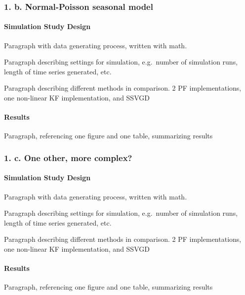 \documentclass[]{article}
\let\oldparagraph\paragraph
\renewcommand{\paragraph}[1]{\oldparagraph{#1}\mbox{}}
\begin{document}
\subsubsection{1. b. Normal-Poisson seasonal
model}\label{b.-normal-poisson-seasonal-model}

\paragraph{Simulation Study Design}\label{simulation-study-design-1}

Paragraph with data generating process, written with math.

Paragraph describing settings for simulation, e.g.~number of simulation
runs, length of time series generated, etc.

Paragraph describing different methods in comparison. 2 PF
implementations, one non-linear KF implementation, and SSVGD

\paragraph{Results}\label{results-1}

Paragraph, referencing one figure and one table, summarizing results

\subsubsection{1. c. One other, more
complex?}\label{c.-one-other-more-complex}

\paragraph{Simulation Study Design}\label{simulation-study-design-2}

Paragraph with data generating process, written with math.

Paragraph describing settings for simulation, e.g.~number of simulation
runs, length of time series generated, etc.

Paragraph describing different methods in comparison. 2 PF
implementations, one non-linear KF implementation, and SSVGD

\paragraph{Results}\label{results-2}

Paragraph, referencing one figure and one table, summarizing results
\end{document}
